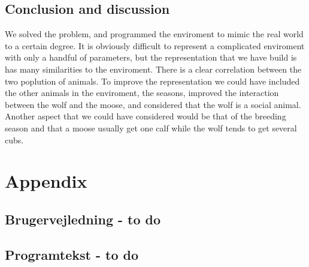 \documentclass[a4paper]{report}
\begin{document}
\subsection*{Conclusion and discussion}
We solved the problem, and programmed the enviroment to mimic the real world to a certain degree. It is obviously difficult to represent a complicated enviroment with only a handful of parameters, but the representation that we have build is has many similarities to the enviroment. There is a clear correlation between the two poplution of animals.
To improve the representation we could have included the other animals in the enviroment, the seasons, improved the interaction between the wolf and the moose, and considered that the wolf is a social animal. Another aspect that we could have considered would be that of the breeding season and that a moose usually get one calf while the wolf tends to get several cubs.

\newpage
\section*{Appendix}

\subsection*{Brugervejledning - to do}

\subsection*{Programtekst - to do}
\end{document}
